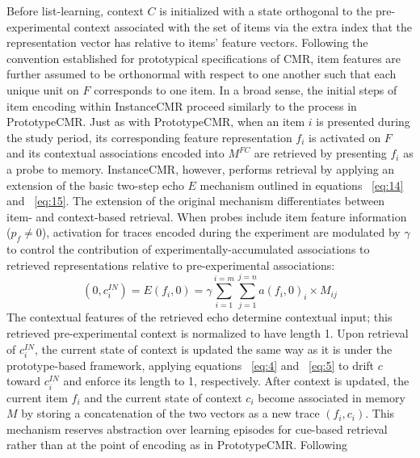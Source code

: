 {}Before list-learning, context $C$ is initialized with a state orthogonal to the pre-experimental context associated with the set of items via the extra index that the representation vector has relative to items’ feature vectors. Following the convention established for prototypical specifications of CMR, item features are further assumed to be orthonormal with respect to one another such that each unique unit on $F$ corresponds to one item.\markdownRendererInterblockSeparator
{}\markdownRendererInterblockSeparator
{}In a broad sense, the initial steps of item encoding within InstanceCMR proceed similarly to the process in PrototypeCMR. Just as with PrototypeCMR, when an item $i$ is presented during the study period, its corresponding feature representation $f_i$ is activated on $F$ and its contextual associations encoded into $M^{FC}$ are retrieved by presenting $f_i$ as a probe to memory. InstanceCMR, however, performs retrieval by applying an extension of the basic two-step echo $E$ mechanism outlined in equations ~\ref{eq:14} and ~\ref{eq:15}. \markdownRendererInterblockSeparator
{}The extension of the original mechanism differentiates between item- and context-based retrieval. When probes include item feature information ($p_f \neq 0$), activation for traces encoded during the experiment are modulated by $\gamma$ to control the contribution of experimentally-accumulated associations to retrieved representations relative to pre-experimental associations:\markdownRendererInterblockSeparator
{}\begin{equation} \label{eq:19} (0 , c_{i}^{IN}) = E(f_i, 0) = {\gamma} \sum^{i=m}_{i=1}\sum^{j=n}_{j=1} a(f_i, 0)_i \times M_{ij} \end{equation}\markdownRendererInterblockSeparator
{}The contextual features of the retrieved echo determine contextual input; this retrieved pre-experimental context is normalized to have length 1. Upon retrieval of $c_{i}^{IN}$, the current state of context is updated the same way as it is under the prototype-based framework, applying equations ~\ref{eq:4} and ~\ref{eq:5} to drift $c$ toward $c_{i}^{IN}$ and enforce its length to 1, respectively.\markdownRendererInterblockSeparator
{}After context is updated, the current item $f_i$ and the current state of context $c_i$ become associated in memory $M$ by storing a concatenation of the two vectors as a new trace $(f_i, c_i)$. This mechanism reserves abstraction over learning episodes for cue-based retrieval rather than at the point of encoding as in PrototypeCMR.\markdownRendererInterblockSeparator
{}\markdownRendererInterblockSeparator
{}Following \relax